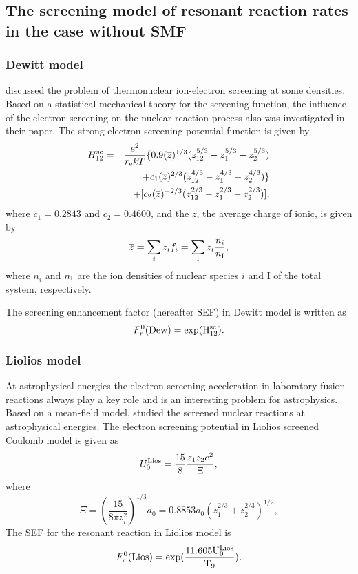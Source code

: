 \documentclass[manuscript]{aastex}
\begin{document}
\subsection{The screening model of resonant reaction rates in the
case without SMF}

\subsubsection{Dewitt model}

 \citet{Dewitt76} discussed the problem of
thermonuclear ion-electron screening at some densities. Based on a
statistical mechanical theory for the screening function, the
influence of the electron screening on the nuclear reaction process
also was investigated in their paper. The strong electron screening
potential function is given by \citep{Dewitt76}
\begin{eqnarray}
 H_{12}^{\rm{sc}}&=&\frac{e^2}{r_{\rm{e}}kT}\{0.9(\overline{z})^{1/3}(z_{12}^{5/3}-z_{1}^{5/3}-z_{2}^{5/3})\nonumber\\
 &&+c_1(\overline{z})^{2/3}(z_{12}^{4/3}-z_{1}^{4/3}-z_{2}^{4/3})\}\nonumber\\
 &&+[c_2(\overline{z})^{-2/3}(z_{12}^{2/3}-z_{1}^{2/3}-z_{2}^{2/3})],
\label{42}
\end{eqnarray}
 where $c_1=0.2843$ and $c_2=0.4600$, and the $\overline{z}$, the average charge of ionic, is given by
\begin{equation}
 \overline{z}=\sum_i z_{i}f_{i}=\sum_{\rm{i}}z_{i}\frac{n_i}{n_{\rm{I}}},
\label{43}
\end{equation}
where $n_{i}$ and $n_{\rm{I}}$ are the ion densities of nuclear
species $i$ and I of the total system, respectively.

The screening enhancement factor (hereafter SEF) in Dewitt model is
written as
\begin{equation}
 F_r^0(\rm{Dew})=\exp(H_{12}^{\rm{sc}}).
\label{44}
\end{equation}


\subsubsection{Liolios model}

At astrophysical energies the electron-screening acceleration in
laboratory fusion reactions always play a key role and is an
interesting problem for astrophysics. Based on a mean-field model,
\citet{Liolios00} studied the screened nuclear reactions at
astrophysical energies. The electron screening potential in Liolios
screened Coulomb model is given as \citep{Liolios00}
\begin{equation}
 U_0^{\rm{Lios}}=\frac{15}{8}\frac{z_1z_2e^2}{\Xi},
\label{45}
\end{equation}
where
\begin{equation}
 \Xi=(\frac{15}{8\pi
 z_{i}^2})^{1/3}a_0=0.8853a_0(z_1^{2/3}+z_2^{2/3})^{1/2},
\label{46}
\end{equation}
The SEF for the resonant reaction in Liolios model is
\begin{equation}
 F_{\rm{r}}^0(\rm{Lios})=\exp(\frac{11.605U_0^{Lios}}{T_9}).
\label{47}
\end{equation}
\end{document}
